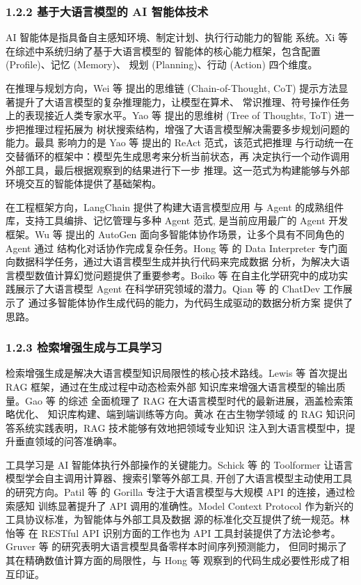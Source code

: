 \subsubsection*{1.2.2 \quad 基于大语言模型的 AI 智能体技术}

AI 智能体是指具备自主感知环境、制定计划、执行行动能力的智能
系统。Xi 等 \cite{ref10} 在综述中系统归纳了基于大语言模型的
智能体的核心能力框架，包含配置 (Profile)、记忆 (Memory)、
规划 (Planning)、行动 (Action) 四个维度。

在推理与规划方向，Wei 等 \cite{ref13} 提出的思维链 (Chain-of-Thought,
CoT) 提示方法显著提升了大语言模型的复杂推理能力，让模型在算术、
常识推理、符号操作任务上的表现接近人类专家水平。Yao 等 \cite{ref30}
提出的思维树 (Tree of Thoughts, ToT) 进一步把推理过程拓展为
树状搜索结构，增强了大语言模型解决需要多步规划问题的能力。最具
影响力的是 Yao 等 \cite{ref18} 提出的 ReAct 范式，该范式把推理
与行动统一在交替循环的框架中：模型先生成思考来分析当前状态，再
决定执行一个动作调用外部工具，最后根据观察到的结果进行下一步
推理。这一范式为构建能够与外部环境交互的智能体提供了基础架构。

在工程框架方向，LangChain \cite{ref15} 提供了构建大语言模型应用
与 Agent 的成熟组件库，支持工具编排、记忆管理与多种 Agent 范式,
是当前应用最广的 Agent 开发框架。Wu 等 \cite{ref19} 提出的
AutoGen 面向多智能体协作场景，让多个具有不同角色的 Agent 通过
结构化对话协作完成复杂任务。Hong 等 \cite{ref20} 的 Data Interpreter
专门面向数据科学任务，通过大语言模型生成并执行代码来完成数据
分析，为解决大语言模型数值计算幻觉问题提供了重要参考。Boiko 等
\cite{ref23} 在自主化学研究中的成功实践展示了大语言模型 Agent
在科学研究领域的潜力。Qian 等 \cite{ref29} 的 ChatDev 工作展示了
通过多智能体协作生成代码的能力，为代码生成驱动的数据分析方案
提供了思路。

\subsubsection*{1.2.3 \quad 检索增强生成与工具学习}

检索增强生成是解决大语言模型知识局限性的核心技术路线。Lewis 等
\cite{ref12} 首次提出 RAG 框架，通过在生成过程中动态检索外部
知识库来增强大语言模型的输出质量。Gao 等 \cite{ref24} 的综述
全面梳理了 RAG 在大语言模型时代的最新进展，涵盖检索策略优化、
知识库构建、端到端训练等方向。黄冰 \cite{ref4} 在古生物学领域
的 RAG 知识问答系统实践表明，RAG 技术能够有效地把领域专业知识
注入到大语言模型中，提升垂直领域的问答准确率。

工具学习是 AI 智能体执行外部操作的关键能力。Schick 等 \cite{ref21}
的 Toolformer 让语言模型学会自主调用计算器、搜索引擎等外部工具,
开创了大语言模型主动使用工具的研究方向。Patil 等 \cite{ref28}
的 Gorilla 专注于大语言模型与大规模 API 的连接，通过检索感知
训练显著提升了 API 调用的准确性。Model Context Protocol
\cite{ref11} 作为新兴的工具协议标准，为智能体与外部工具及数据
源的标准化交互提供了统一规范。林怡等 \cite{ref3} 在 RESTful API
识别方面的工作也为 API 工具封装提供了方法论参考。Gruver 等
\cite{ref22} 的研究表明大语言模型具备零样本时间序列预测能力，
但同时揭示了其在精确数值计算方面的局限性，与 Hong 等 \cite{ref20}
观察到的代码生成必要性形成了相互印证。

